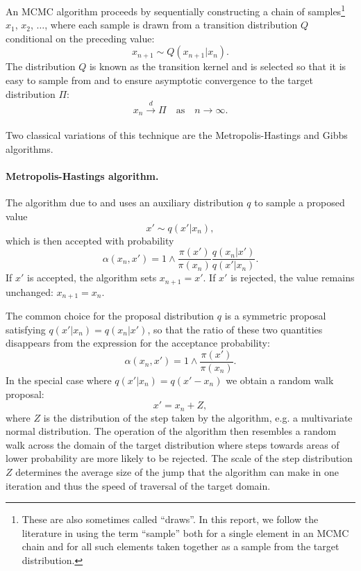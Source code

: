 \documentclass[12pt,a4paper]{report}
\begin{document}


An MCMC algorithm proceeds by sequentially constructing a chain of samples\footnote{These are also sometimes called ``draws''. In this report, we follow the literature in using the term ``sample'' both for a single element in an MCMC chain and for all such elements taken together as a sample from the target distribution.} $x_1$, $x_2$, $\dots$,  where each sample is drawn from a transition distribution $Q$ conditional on the preceding value:
$$x_{n+1} \sim Q(x_{n+1}|x_n).$$
The distribution $Q$ is known as the transition kernel and is selected so that it is easy to sample from and to ensure asymptotic convergence to the target distribution $\Pi$:
$$x_n \xrightarrow[]{d} \Pi \quad\text{as}\quad n \to \infty.$$

Two classical variations of this technique are the Metropolis-Hastings and Gibbs algorithms.

\paragraph{Metropolis-Hastings algorithm.} The algorithm due to \cite{metropolisEquationStateCalculations1953} and \cite{hastingsMonteCarloSampling1970} uses an auxiliary distribution $q$ to sample a proposed value
$$x' \sim q(x' | x_n),$$
which is then accepted with probability
$$\alpha(x_n, x') = 1 \wedge \frac{\pi(x')}{\pi(x_n)} \frac{q(x_n|x')}{q(x'|x_n)}.$$
If $x'$ is accepted, the algorithm sets $x_{n+1} = x'$. If $x'$ is rejected, the value remains unchanged: $x_{n+1} = x_n$.


The common choice for the proposal distribution $q$ is a symmetric proposal satisfying $q(x'|x_n) = q(x_n|x')$, so that the ratio of these two quantities disappears from the expression for the acceptance probability:
$$\alpha(x_n, x') = 1 \wedge \frac{\pi(x')}{\pi(x_n)}.$$
In the special case where $q(x'|x_n) = q(x' - x_n)$ we obtain a random walk proposal:
$$x' = x_n + Z,$$
where $Z$ is the distribution of the step taken by the algorithm, e.g. a multivariate normal distribution. The operation of the algorithm then resembles a random walk across the domain of the target distribution where steps towards areas of lower probability are more likely to be rejected. The scale of the step distribution $Z$ determines the average size of the jump that the algorithm can make in one iteration and thus the speed of traversal of the target domain.
\end{document}
